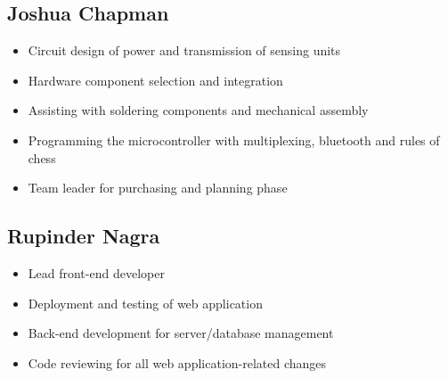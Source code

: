 \documentclass{article}
\begin{document}
\subsection{Joshua Chapman}
\begin{itemize}
    \item Circuit design of power and transmission of sensing units
    \item Hardware component selection and integration
    \item Assisting with soldering components and mechanical assembly
    \item Programming the microcontroller with multiplexing, bluetooth and rules of chess
    \item Team leader for purchasing and planning phase
\end{itemize}

\subsection{Rupinder Nagra}
\begin{itemize}
    \item Lead front-end developer
    \item Deployment and testing of web application
    \item Back-end development for server/database management
    \item Code reviewing for all web application-related changes
\end{itemize}
\end{document}
